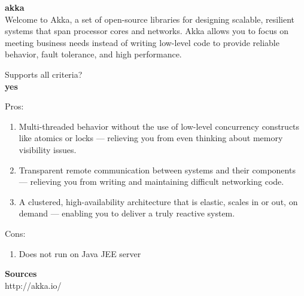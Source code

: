 
		\textbf{akka} \\
		Welcome to Akka, a set of open-source libraries for designing scalable, resilient systems that span processor cores and networks. Akka allows you to focus on meeting business needs instead of writing low-level code to provide reliable behavior, fault tolerance, and high performance.
		
		Supports all criteria?\\
		\textbf{yes}
		
		
		Pros:
		\begin{enumerate}
			\item Multi-threaded behavior without the use of low-level concurrency constructs like atomics or locks — relieving you from even thinking about memory visibility issues.
			\item Transparent remote communication between systems and their components — relieving you from writing and maintaining difficult networking code.
			\item A clustered, high-availability architecture that is elastic, scales in or out, on demand — enabling you to deliver a truly reactive system.
		\end{enumerate}
		Cons:
		\begin{enumerate}
			\item Does not run on Java JEE server
		\end{enumerate}
	
	\textbf{Sources}\\
	http://akka.io/